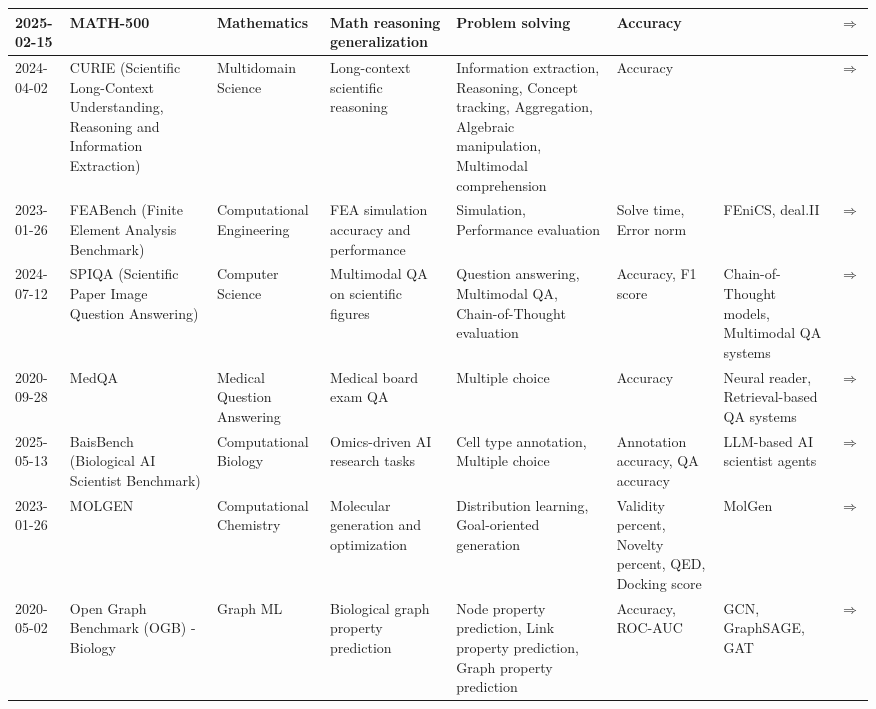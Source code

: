 \documentclass{article}
\begin{document}
\begin{landscape}
{\begin{longtable}{|p{1.5cm}|p{2.5cm}|p{2cm}|p{2cm}|p{3cm}|p{2cm}|p{2cm}|p{1cm}|}
2025-02-15 & MATH-500 & Mathematics & Math reasoning generalization & Problem solving & Accuracy &  & \cite{huggingface2025math500} \href{https://huggingface.co/datasets/HuggingFaceH4/MATH-500}{$\Rightarrow$ } \\ \hline
2024-04-02 & CURIE (Scientific Long-Context Understanding, Reasoning and Information Extraction) & Multidomain Science & Long-context scientific reasoning & Information extraction, Reasoning, Concept tracking, Aggregation, Algebraic manipulation, Multimodal comprehension & Accuracy &  & \cite{curie2024} \href{https://arxiv.org/abs/2404.02029}{$\Rightarrow$ } \\ \hline
2023-01-26 & FEABench (Finite Element Analysis Benchmark) & Computational Engineering & FEA simulation accuracy and performance & Simulation, Performance evaluation & Solve time, Error norm & FEniCS, deal.II & \cite{allen2023feabench} \href{https://github.com/alleninstitute/feabench}{$\Rightarrow$ } \\ \hline
2024-07-12 & SPIQA (Scientific Paper Image Question Answering) & Computer Science & Multimodal QA on scientific figures & Question answering, Multimodal QA, Chain-of-Thought evaluation & Accuracy, F1 score & Chain-of-Thought models, Multimodal QA systems & \cite{zhong2024spiqa} \href{https://arxiv.org/abs/2407.09413}{$\Rightarrow$ } \\ \hline
2020-09-28 & MedQA & Medical Question Answering & Medical board exam QA & Multiple choice & Accuracy & Neural reader, Retrieval-based QA systems & \cite{jin2020what} \href{https://arxiv.org/abs/2009.13081}{$\Rightarrow$ } \\ \hline
2025-05-13 & BaisBench (Biological AI Scientist Benchmark) & Computational Biology & Omics-driven AI research tasks & Cell type annotation, Multiple choice & Annotation accuracy, QA accuracy & LLM-based AI scientist agents & \cite{luo2025benchmarkingaiscientistsomics} \href{https://arxiv.org/abs/2505.08341}{$\Rightarrow$ } \\ \hline
2023-01-26 & MOLGEN & Computational Chemistry & Molecular generation and optimization & Distribution learning, Goal-oriented generation & Validity percent, Novelty percent, QED, Docking score & MolGen & \cite{fang2023domain} \href{https://arxiv.org/abs/2301.11259}{$\Rightarrow$ } \\ \hline
2020-05-02 & Open Graph Benchmark (OGB) - Biology & Graph ML & Biological graph property prediction & Node property prediction, Link property prediction, Graph property prediction & Accuracy, ROC-AUC & GCN, GraphSAGE, GAT & \cite{hu2020ogb} \href{https://arxiv.org/abs/2005.00687}{$\Rightarrow$ } \\ \hline

\end{longtable}}
\end{landscape}
\end{document}
